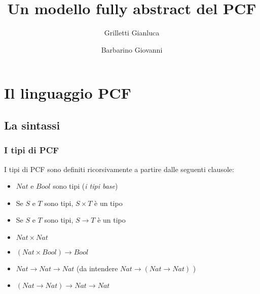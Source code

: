 \documentclass{beamer}
\title{Un modello fully abstract del PCF}
\author{Grilletti Gianluca \and Barbarino Giovanni}
\institute[Unipi]{Università di Pisa}
\begin{document}
\small


\section{Il linguaggio PCF}
\subsection{La sintassi}

\begin{frame}
	\maketitle
	
\end{frame}


\begin{frame}
	\frametitle{I tipi di PCF}
	
	I tipi di PCF sono definiti ricorsivamente a partire dalle seguenti clausole:
	\begin{itemize}
		\item $Nat$ e $Bool$ sono tipi (\emph{i tipi base})
		\item Se $S$ e $T$ sono tipi, $S\times T$ è un tipo
		\item Se $S$ e $T$ sono tipi, $S\rightarrow T$ è un tipo
	\end{itemize}
	
	\begin{example}
		\begin{itemize}
			\item $Nat\times Nat$
			\item $(Nat\times Bool) \rightarrow Bool$
			\item $Nat\rightarrow Nat\rightarrow Nat$ (da intendere $Nat\rightarrow (Nat\rightarrow Nat)$  )
			\item $(Nat \rightarrow Nat) \rightarrow Nat \rightarrow Nat$
		\end{itemize}

	\end{example}

	
\end{frame}
\end{document}
